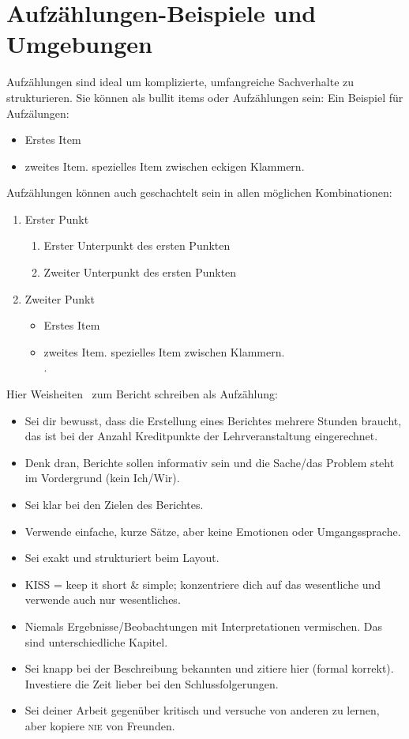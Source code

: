 \section{Aufzählungen-Beispiele und Umgebungen}\label{sec:itemize}
Aufzählungen sind ideal um komplizierte, umfangreiche Sachverhalte zu strukturieren. Sie können als bullit items oder Aufzählungen sein: Ein Beispiel für Aufzälungen:
\begin{itemize}
\item Erstes Item
\item[$\Omega$] zweites Item. spezielles Item zwischen eckigen Klammern.
\end{itemize}
Aufzählungen können auch geschachtelt sein in allen möglichen Kombinationen:
\begin{enumerate}
  \item Erster Punkt
  \begin{enumerate}
     \item Erster Unterpunkt des ersten Punkten
     \item Zweiter Unterpunkt des ersten Punkten
  \end{enumerate}
  \item Zweiter Punkt
  \begin{itemize}
     \item Erstes Item
     \item[$\Omega$] zweites Item. spezielles Item zwischen Klammern. \[\].
  \end{itemize}
\end{enumerate}

Hier \glqq Weisheiten\grqq~ zum Bericht schreiben als Aufzählung:
\begin{itemize}
    \item Sei dir bewusst, dass die Erstellung eines Berichtes mehrere Stunden braucht, das ist bei der Anzahl Kreditpunkte der Lehrveranstaltung eingerechnet.
    \item Denk dran, Berichte sollen informativ sein und die Sache/das Problem steht im Vordergrund (kein Ich/Wir).
    \item Sei klar bei den Zielen des Berichtes.
    \item Verwende einfache, kurze Sätze, aber keine Emotionen oder Umgangssprache.
    \item Sei exakt und strukturiert beim Layout.
    \item KISS = keep it short \& simple; konzentriere dich auf das wesentliche und verwende auch nur wesentliches.
    \item Niemals Ergebnisse/Beobachtungen mit Interpretationen vermischen. Das sind unterschiedliche Kapitel.
    \item Sei knapp bei der Beschreibung bekannten und zitiere hier (formal korrekt). Investiere die Zeit lieber bei den Schlussfolgerungen.
    \item Sei deiner Arbeit gegenüber kritisch und versuche von anderen zu lernen, aber kopiere {\scshape\Large nie} von \grqq Freunden\grqq.
\end{itemize}

